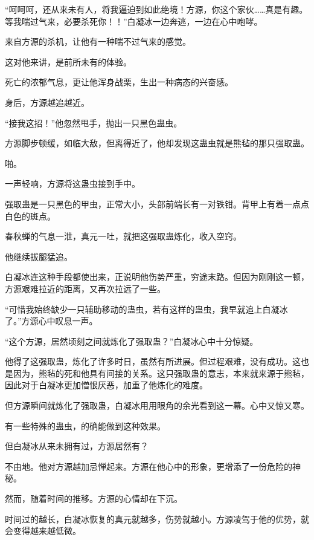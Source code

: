 
\begin{this_body}



“呵呵呵，还从来未有人，将我逼迫到如此绝境！方源，你这个家伙……真是有趣。等我喘过气来，必要杀死你！！”白凝冰一边奔逃，一边在心中咆哮。

来自方源的杀机，让他有一种喘不过气来的感觉。

这对他来讲，是前所未有的体验。

死亡的浓郁气息，更让他浑身战栗，生出一种病态的兴奋感。

身后，方源越追越近。

“接我这招！”他忽然甩手，抛出一只黑色蛊虫。

方源脚步顿缓，如临大敌，但离得近了，他却发现这蛊虫就是熊毡的那只强取蛊。

啪。

一声轻响，方源将这蛊虫接到手中。

强取蛊是一只黑色的甲虫，正常大小，头部前端长有一对铁钳。背甲上有着一点点白色的斑点。

春秋蝉的气息一泄，真元一吐，就把这强取蛊炼化，收入空窍。

他继续拔腿猛追。

白凝冰连这种手段都使出来，正说明他伤势严重，穷途末路。但因为刚刚这一顿，方源艰难拉近的距离，又再次拉远了一些。

“可惜我始终缺少一只辅助移动的蛊虫，若有这样的蛊虫，我早就追上白凝冰了。”方源心中叹息一声。

“这个方源，居然顷刻之间就炼化了强取蛊？”白凝冰心中十分惊疑。

他得了这强取蛊，炼化了许多时日，虽然有所进展。但过程艰难，没有成功。这也是因为，熊毡的死和他具有间接的关系。这只强取蛊的意志，本来就来源于熊毡，因此对于白凝冰更加憎恨厌恶，加重了他炼化的难度。

但方源瞬间就炼化了强取蛊，白凝冰用用眼角的余光看到这一幕。心中又惊又寒。

有一些特殊的蛊虫，的确能做到这种效果。

但白凝冰从来未拥有过，方源居然有？

不由地。他对方源越加忌惮起来。方源在他心中的形象，更增添了一份危险的神秘。

然而，随着时间的推移。方源的心情却在下沉。

时间过的越长，白凝冰恢复的真元就越多，伤势就越小。方源凌驾于他的优势，就会变得越来越低微。


\end{this_body}
